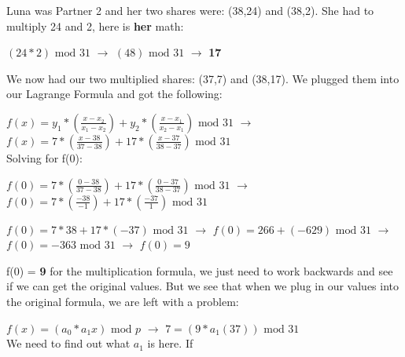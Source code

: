 \documentclass[10pt]{article}
\begin{document}
\noindent Luna was Partner 2 and her two shares were: (38,24) and (38,2). 
She had to multiply 24 and 2, here is \textbf{her} math:\\ \vspace{0.1in}

$\left(24*2\right) \textrm{ mod } 31$ $\rightarrow$
$\left(48\right) \textrm{ mod } 31$ $\rightarrow$ \textbf{17}\\
\newline

\noindent We now had our two multiplied shares: (37,7) and (38,17). We plugged them into our Lagrange Formula and got the following:\\ \vspace{0.1in}

$f(x) = y_1*\left(\frac{x - x_2}{x_1 - x_2}\right) + y_2*\left(\frac{x - x_1}{x_2 - x_1}\right) \textrm{ mod } 31$ 
$\rightarrow$
$f(x) = 7*\left(\frac{x - 38}{37 - 38}\right) + 17*\left(\frac{x - 37}{38 - 37}\right) \textrm{ mod } 31$\\

\noindent Solving for f(0):\\ \vspace{0.1in}

$f(0) = 7*\left(\frac{0 - 38}{37 - 38}\right) + 17*\left(\frac{0 - 37}{38 - 37}\right) \textrm{ mod } 31$
$\rightarrow$
$f(0) = 7*\left(\frac{-38}{-1}\right) + 17*\left(\frac{-37}{1}\right)  \textrm{ mod } 31$
\vspace{0.1in}

$f(0) = 7*38 + 17*(-37)  \textrm{ mod } 31$
$\rightarrow$
$f(0) = 266 + (-629)  \textrm{ mod } 31$
$\rightarrow$
$f(0) = -363  \textrm{ mod } 31$
$\rightarrow$
$f(0) = 9$

\vspace{0.1in}
\noindent f(0) = \textbf{9} for the multiplication formula, we just need to work backwards and see if we can get the original values. 
But we see that when we plug in our values into the original formula, we are left with a problem: \\ \vspace{0.1in}

$f(x) = (a_0 * a_1x) \textrm{ mod } p$ 
$\rightarrow$
$7 = (9 * a_1(37)) \textrm{ mod } 31$ \\

\noindent We need to find out what $a_1$ is here. If 
\end{document}
